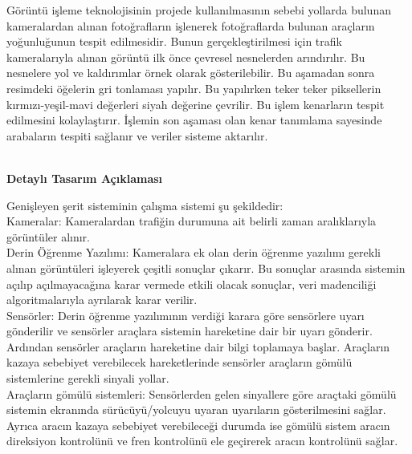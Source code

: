 \documentclass[12pt,a4paper]{report}
\begin{document}
Görüntü işleme teknolojisinin projede kullanılmasının sebebi yollarda bulunan kameralardan alınan fotoğrafların işlenerek fotoğraflarda bulunan araçların yoğunluğunun tespit edilmesidir. Bunun gerçekleştirilmesi için trafik kameralarıyla alınan görüntü ilk önce çevresel nesnelerden arındırılır. Bu nesnelere yol ve kaldırımlar örnek olarak gösterilebilir. Bu aşamadan sonra resimdeki öğelerin gri tonlaması yapılır. Bu yapılırken teker teker piksellerin kırmızı-yeşil-mavi değerleri siyah değerine çevrilir. Bu işlem kenarların tespit edilmesini kolaylaştırır. İşlemin son aşaması olan kenar tanımlama sayesinde arabaların tespiti sağlanır ve veriler sisteme aktarılır. \\ \\

\newpage

{\large\bfseries Detaylı Tasarım Açıklaması\\ \par}

Genişleyen şerit sisteminin çalışma sistemi şu şekildedir: \\

Kameralar: Kameralardan trafiğin durumuna ait belirli zaman aralıklarıyla görüntüler alınır. \\

Derin Öğrenme Yazılımı:  Kameralara ek olan derin öğrenme yazılımı gerekli alınan görüntüleri işleyerek çeşitli sonuçlar çıkarır. Bu sonuçlar arasında sistemin açılıp açılmayacağına karar vermede etkili olacak sonuçlar, veri madenciliği algoritmalarıyla ayrılarak karar verilir. \\

Sensörler: Derin öğrenme yazılımının verdiği karara göre sensörlere uyarı gönderilir ve sensörler araçlara sistemin hareketine dair bir uyarı gönderir. Ardından sensörler araçların hareketine dair bilgi toplamaya başlar. Araçların kazaya sebebiyet verebilecek hareketlerinde sensörler araçların gömülü sistemlerine gerekli sinyali yollar. \\

Araçların gömülü sistemleri: Sensörlerden gelen sinyallere göre araçtaki gömülü sistemin ekranında sürücüyü/yolcuyu uyaran uyarıların gösterilmesini sağlar. Ayrıca aracın kazaya sebebiyet verebileceği durumda ise gömülü sistem aracın direksiyon kontrolünü ve fren kontrolünü ele geçirerek aracın kontrolünü sağlar. \\ \\

\newpage
\end{document}
